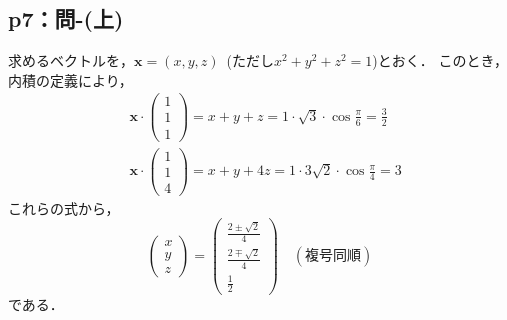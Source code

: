 \documentclass[uplatex,dvipdfmx,a4paper,10pt,fleqn]{jsarticle}
\begin{document}
\newpage

\subsection*{p7：問-(上)}

\begin{tleftbar}
    求めるベクトルを，$\bm{x}=(x,y,z)$~(ただし$x^2+y^2 +z^2=1$)とおく．
    このとき，内積の定義により，
    \begin{align*}
        &\bm{x} \cdot 
        \begin{pmatrix}
                1 \\
                1 \\
                1
            \end{pmatrix}
        =x+y+z= 1 \cdot \sqrt{3} \cdot \cos \frac{\pi}{6} =\frac{3}{2} \\
        &\bm{x} \cdot 
            \begin{pmatrix}
                1 \\
                1 \\
                4
            \end{pmatrix}
        =x+y+4z= 1 \cdot 3\sqrt{2} \cdot \cos \frac{\pi}{4} =3
        \end{align*}
        これらの式から，
        \begin{equation*}
            \begin{pmatrix}
            x \\
            y \\
            z  
    \end{pmatrix}
    =
                \begin{pmatrix}
                \frac{2 \pm \sqrt{2}}{4} \\
                \frac{2 \mp \sqrt{2}}{4} \\
                \frac{1}{2} 
    \end{pmatrix}
            \quad (\text{複号同順})
    \end{equation*}
        である．
    \end{tleftbar}
\end{document}
